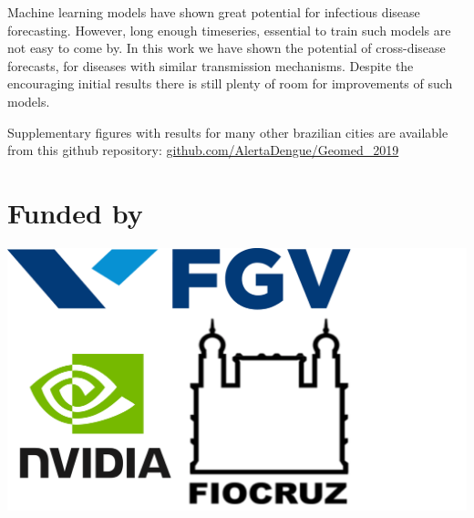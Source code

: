 \documentclass[a0,portrait]{a0poster}
\begin{document}
\begin{multicols}{3}
Machine learning models have shown great potential for infectious disease 
forecasting. However, long enough timeseries, essential to train such models 
are not easy to come by. In this work we have shown the potential of 
cross-disease forecasts, for diseases with similar transmission mechanisms. 
Despite the encouraging initial results there is still plenty of room for 
improvements of such models. 

Supplementary figures with results for many other brazilian cities are 
available from this github repository: \url{github.com/AlertaDengue/Geomed_2019}


\small
\nocite{*} %


\section*{Funded by}
\begin{center}\vspace{0cm}
\includegraphics[width=0.65\linewidth]{figures/fundedby.png}
\end{center}%


\end{multicols}
\end{document}
